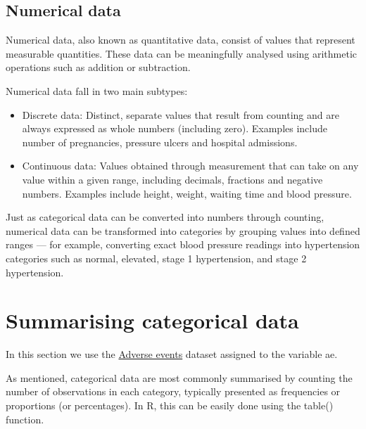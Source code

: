 \documentclass[
]{book}
\newenvironment{Shaded}{\begin{snugshade}}{\end{snugshade}}
\newcommand{\CommentTok}[1]{\textcolor[rgb]{0.56,0.35,0.01}{\textit{#1}}}
\newcommand{\FunctionTok}[1]{\textcolor[rgb]{0.13,0.29,0.53}{\textbf{#1}}}
\newcommand{\NormalTok}[1]{#1}
\newcommand{\OtherTok}[1]{\textcolor[rgb]{0.56,0.35,0.01}{#1}}
\newcommand{\SpecialCharTok}[1]{\textcolor[rgb]{0.81,0.36,0.00}{\textbf{#1}}}
\begin{document}
\subsection{Numerical data}\label{numerical-data}

Numerical data, also known as quantitative data, consist of values that represent measurable quantities. These data can be meaningfully analysed using arithmetic operations such as addition or subtraction.

Numerical data fall in two main subtypes:

\begin{itemize}
\item
  Discrete data: Distinct, separate values that result from counting and are always expressed as whole numbers (including zero). Examples include number of pregnancies, pressure ulcers and hospital admissions.
\item
  Continuous data: Values obtained through measurement that can take on any value within a given range, including decimals, fractions and negative numbers. Examples include height, weight, waiting time and blood pressure.
\end{itemize}

Just as categorical data can be converted into numbers through counting, numerical data can be transformed into categories by grouping values into defined ranges --- for example, converting exact blood pressure readings into hypertension categories such as normal, elevated, stage 1 hypertension, and stage 2 hypertension.

\section{Summarising categorical data}\label{summarising-categorical-data}

In this section we use the \hyperref[adverse-events]{Adverse events} dataset assigned to the variable ae.

As mentioned, categorical data are most commonly summarised by counting the number of observations in each category, typically presented as frequencies or proportions (or percentages). In R, this can be easily done using the table() function.

\begin{Shaded}
\end{Shaded}
\end{document}
